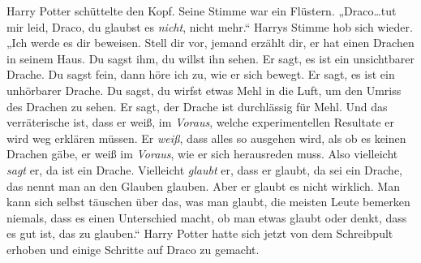 Harry Potter schüttelte den Kopf. Seine Stimme war ein Flüstern.
„Draco…tut mir leid, Draco, du glaubst es \emph{nicht}, nicht mehr.“ Harrys Stimme hob sich wieder.
„Ich werde es dir beweisen. Stell dir vor, jemand erzählt dir, er hat einen Drachen in seinem Haus. Du sagst ihm, du willst ihn sehen. Er sagt, es ist ein unsichtbarer Drache. Du sagst fein, dann höre ich zu, wie er sich bewegt. Er sagt, es ist ein unhörbarer Drache. Du sagst, du wirfst etwas Mehl in die Luft, um den Umriss des Drachen zu sehen. Er sagt, der Drache ist durchlässig für Mehl. Und das verräterische ist, dass er weiß, im \emph{Voraus}, welche experimentellen Resultate er wird weg erklären müssen. Er \emph{weiß}, dass alles so ausgehen wird, als ob es keinen Drachen gäbe, er weiß im \emph{Voraus}, wie er sich herausreden muss. Also vielleicht \emph{sagt} er, da ist ein Drache. Vielleicht \emph{glaubt} er, dass er glaubt, da sei ein Drache, das nennt man an den Glauben glauben. Aber er glaubt es nicht wirklich. Man kann sich selbst täuschen über das, was man glaubt, die meisten Leute bemerken niemals, dass es einen Unterschied macht, ob man etwas glaubt oder denkt, dass es gut ist, das zu glauben.“ Harry Potter hatte sich jetzt von dem Schreibpult erhoben und einige Schritte auf Draco zu gemacht.
